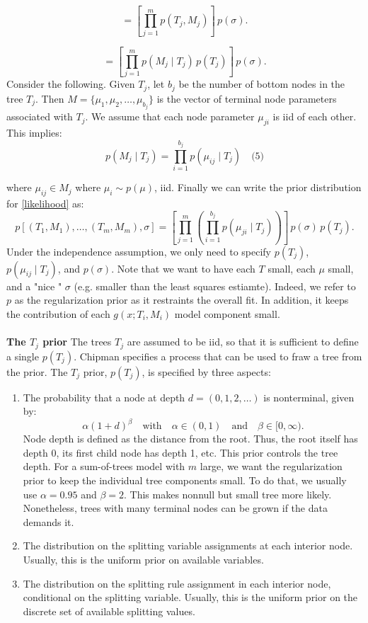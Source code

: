 \documentclass[a4paper,11pt]{article}
\begin{document}
\[
= \left[ \prod_{j=1}^m p(T_j, M_j) \right] \, p(\sigma).
\]

\[
= \left[ \prod_{j=1}^m p(M_j \mid T_j) \, p(T_j) \right] \, p(\sigma).
\]
Consider the following. Given $T_j$, let  \( b_j \)  be the number of bottom nodes in the tree \( T_j \). Then \( M = \{\mu_1, \mu_2, \ldots, \mu_{b_j}\} \) is the vector of terminal node parameters associated with \( T_j \).  We assume that each node parameter \( \mu_{ji} \) is iid of each other. This implies: 
\[
p(M_j \mid T_j) = \prod_{i=1}^{b_j} p(\mu_{ij} \mid T_j) \quad \text{(5)}
\]

where \( \mu_{ij} \in M_j \) where \( \mu_i \sim p(\mu) \), iid.
Finally we can write the prior distribution for \eqref{likelihood} as:
\[
p[(T_1, M_1), \ldots, (T_m, M_m), \sigma]= \left[ \prod_{j=1}^m \left( \prod_{i=1}^{b_j} p(\mu_{ji} \mid T_j) \right) \right] \, p(\sigma) \, p(T_j).
\]
Under the independence assumption, we only need to specify \( p(T_j) \), \( p(\mu_{ij} \mid T_j) \), and \( p(\sigma) \). Note that we want to have each $T$ small, each $\mu$ small,  and a "nice " $\sigma$  (e.g. smaller than the least squares estiamte). Indeed, we refer to $p$ as the regularization prior as it restraints the overall fit. In addition, it keeps the contribution of each $g(x;T_i,M_i)$ model component small.  
\\\\
\textbf{The $T_j$ prior}
The trees $T_j$ are assumed to be iid, so that it is sufficient to define a single $p(T_j)$. Chipman specifies a process 
 that can be used to fraw a tree from the prior. The \( T_j \) prior, \( p(T_j) \), is specified by three aspects:
\begin{enumerate}
    \item The probability that a node at depth \( d = (0, 1, 2, \ldots) \) is nonterminal, given by:
    \[
    \alpha (1 + d)^\beta \quad \text{with} \quad \alpha \in (0, 1) \quad \text{and} \quad \beta \in [0, \infty).
    \]
    Node depth is defined as the distance from the root. Thus, the root itself has depth 0, its first child node has depth 1, etc. This prior controls the tree depth. For a sum-of-trees model with \( m \) large, we want the regularization prior to keep the individual tree components small. To do that, we usually use \( \alpha = 0.95 \) and \( \beta = 2 \).  This makes nonnull but small tree more likely. Nonetheless,  trees with many terminal nodes can be grown if the data demands it.
    
    \item The distribution on the splitting variable assignments at each interior node. Usually, this is the uniform prior on available variables.
    
    \item The distribution on the splitting rule assignment in each interior node, conditional on the splitting variable. Usually, this is the uniform prior on the discrete set of available splitting values.
\end{enumerate}
\end{document}
